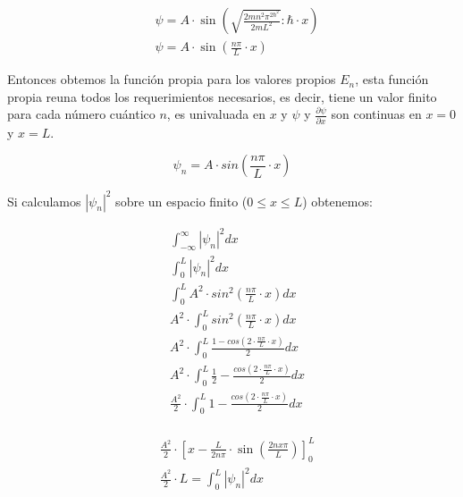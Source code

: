 \documentclass[a4paper]{article}
\begin{document}
        \begin{align*}
            &\psi = A \cdot \sin(\sqrt{\frac{2mn^{2}\pi^{2\hbar^{2}}}{2mL^{2}}} \colon \hbar \cdot x)\\
            &\psi = A \cdot \sin(\frac{n\pi}{L} \cdot x)
        \end{align*}

        \indent Entonces obtemos la función propia para los valores propios $E_n$, esta función propia reuna todos los requerimientos necesarios, es decir, tiene un valor finito para cada número cuántico $n$, es univaluada en $x$ y $\psi$ y $\frac{\partial \psi}{\partial x}$ son continuas en $x = 0$ y $x = L$.

        \begin{equation}
            \psi_n = A \cdot sin(\frac{n\pi}{L} \cdot x)
        \end{equation}

        \indent Si calculamos $\left| \psi_n \right|^{2}$ sobre un espacio finito ($0 \leq x \leq L$) obtenemos:

        \begin{align*}
            &\int_{-\infty}^{\infty} \left| \psi_n \right|^{2} dx \\
            &\int_{0}^{L} \left| \psi_n \right|^{2} dx \\
            &\int_{0}^{L} A^{2} \cdot sin^{2}(\frac{n\pi}{L} \cdot x) dx \\
            &A^{2} \cdot \int_{0}^{L} sin^{2}(\frac{n\pi}{L} \cdot x) dx \\
            &A^{2} \cdot \int_{0}^{L} \frac{1 - cos(2 \cdot \frac{n\pi}{L} \cdot x)}{2} dx \\
            &A^{2} \cdot \int_{0}^{L} \frac{1}{2} - \frac{cos(2 \cdot \frac{n\pi}{L} \cdot x)}{2} dx \\
            &\frac{A^{2}}{2} \cdot \int_{0}^{L} 1 - \frac{cos(2 \cdot \frac{n\pi}{L} \cdot x)}{2} dx\\
        \end{align*}

        \saltoPag

        \vspace{-1mm}

        \begin{align*}
            &\frac{A^{2}}{2} \cdot \left[ x - \frac{L}{2n\pi} \cdot \sin(\frac{2nx\pi}{L}) \right]_{0}^{L} \\
            &\frac{A^{2}}{2} \cdot L = \int_{0}^{L} \left| \psi_n \right|^{2} dx \\
        \end{align*}
\end{document}
